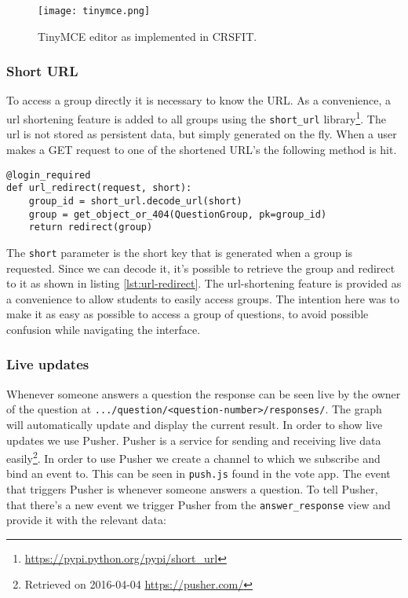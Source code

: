 \begin{figure}[H]
\capstart
	\centering
		\texttt{[image: tinymce.png]}
	\caption[TinyMCE]{TinyMCE editor as implemented in CRSFIT.}\label{fig:tinymce}
\end{figure}

\subsubsection*{Short URL}
To access a group directly it is necessary to know the URL. As a convenience, a url shortening feature is added to all groups using the \texttt{short\_url} library\footnote{\url{https://pypi.python.org/pypi/short_url}}. The url is not stored as persistent data, but simply generated on the fly. When a user makes a GET request to one of the shortened URL's the following method is hit.

\begin{lstlisting}[caption=The URL redirect method, label=lst:url-redirect]
@login_required
def url_redirect(request, short):
    group_id = short_url.decode_url(short)
    group = get_object_or_404(QuestionGroup, pk=group_id)
    return redirect(group)
\end{lstlisting}

The \texttt{short} parameter is the short key that is generated when a group is requested. Since we can decode it, it's possible to retrieve the group and redirect to it as shown in listing \ref{lst:url-redirect}. The url-shortening feature is provided as a convenience to allow students to easily access groups. The intention here was to make it as easy as possible to access a group of questions, to avoid possible confusion while navigating the interface.

\subsubsection*{Live updates}
Whenever someone answers a question the response can be seen live by the owner of the question at \texttt{.../question/<question-number>/responses/}. The graph will automatically update and display the current result. In order to show live updates we use Pusher. Pusher is a service for sending and receiving live data easily\footnote{Retrieved on 2016-04-04 \url{https://pusher.com/}}.
In order to use Pusher we create a channel to which we subscribe and bind an event to. This can be seen in \texttt{push.js} found in the vote app. The event that triggers Pusher is whenever someone answers a question. To tell Pusher, that there's a new event we trigger Pusher from the \texttt{answer\_response} view and provide it with the relevant data:

